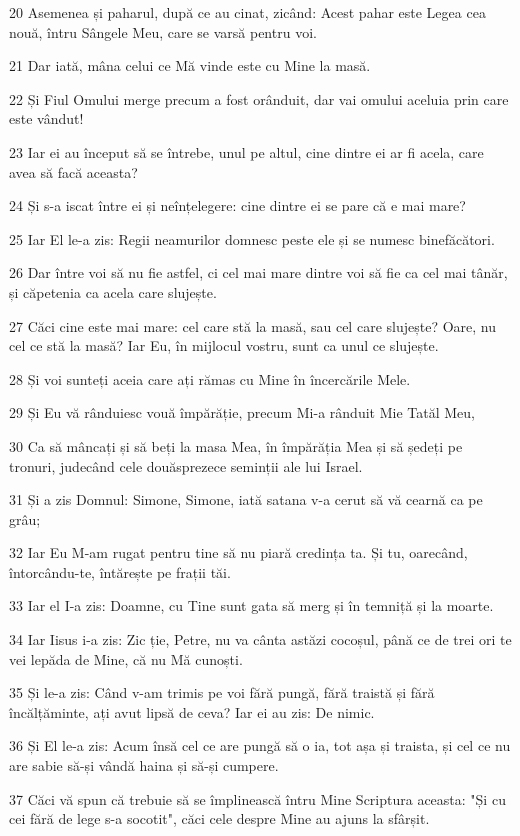 \par 20 Asemenea și paharul, după ce au cinat, zicând: Acest pahar este Legea cea nouă, întru Sângele Meu, care se varsă pentru voi.
\par 21 Dar iată, mâna celui ce Mă vinde este cu Mine la masă.
\par 22 Și Fiul Omului merge precum a fost orânduit, dar vai omului aceluia prin care este vândut!
\par 23 Iar ei au început să se întrebe, unul pe altul, cine dintre ei ar fi acela, care avea să facă aceasta?
\par 24 Și s-a iscat între ei și neînțelegere: cine dintre ei se pare că e mai mare?
\par 25 Iar El le-a zis: Regii neamurilor domnesc peste ele și se numesc binefăcători.
\par 26 Dar între voi să nu fie astfel, ci cel mai mare dintre voi să fie ca cel mai tânăr, și căpetenia ca acela care slujește.
\par 27 Căci cine este mai mare: cel care stă la masă, sau cel care slujește? Oare, nu cel ce stă la masă? Iar Eu, în mijlocul vostru, sunt ca unul ce slujește.
\par 28 Și voi sunteți aceia care ați rămas cu Mine în încercările Mele.
\par 29 Și Eu vă rânduiesc vouă împărăție, precum Mi-a rânduit Mie Tatăl Meu,
\par 30 Ca să mâncați și să beți la masa Mea, în împărăția Mea și să ședeți pe tronuri, judecând cele douăsprezece seminții ale lui Israel.
\par 31 Și a zis Domnul: Simone, Simone, iată satana v-a cerut să vă cearnă ca pe grâu;
\par 32 Iar Eu M-am rugat pentru tine să nu piară credința ta. Și tu, oarecând, întorcându-te, întărește pe frații tăi.
\par 33 Iar el I-a zis: Doamne, cu Tine sunt gata să merg și în temniță și la moarte.
\par 34 Iar Iisus i-a zis: Zic ție, Petre, nu va cânta astăzi cocoșul, până ce de trei ori te vei lepăda de Mine, că nu Mă cunoști.
\par 35 Și le-a zis: Când v-am trimis pe voi fără pungă, fără traistă și fără încălțăminte, ați avut lipsă de ceva? Iar ei au zis: De nimic.
\par 36 Și El le-a zis: Acum însă cel ce are pungă să o ia, tot așa și traista, și cel ce nu are sabie să-și vândă haina și să-și cumpere.
\par 37 Căci vă spun că trebuie să se împlinească întru Mine Scriptura aceasta: "Și cu cei fără de lege s-a socotit", căci cele despre Mine au ajuns la sfârșit.
